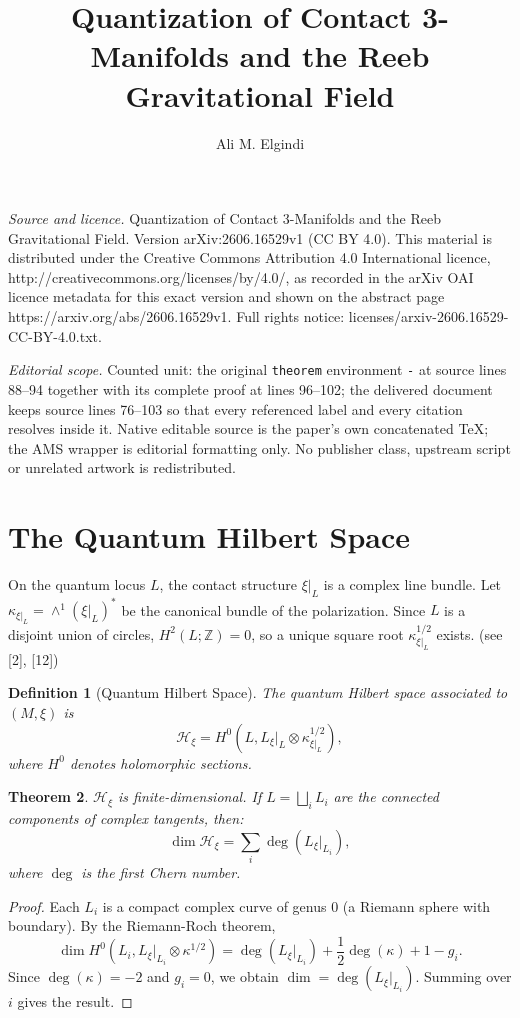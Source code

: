\documentclass[10pt,a4paper]{amsart}
\newtheorem{theorem}{Theorem}[section]
\newtheorem{definition}[theorem]{Definition}
\newcommand{\Z}{\mathbb{Z}}
\newcommand{\Hilb}{\mathcal{H}}
\begin{document}
\title[Quantization of Contact 3-Manifolds and the Reeb Gravitation]{Quantization of Contact 3-Manifolds and the Reeb Gravitational Field}
\author{Ali M. Elgindi}
\date{}
\maketitle
\noindent\emph{Source and licence.} Quantization of Contact 3-Manifolds and the Reeb Gravitational Field. Version arXiv:2606.16529v1 (CC BY 4.0). This material is distributed under the Creative Commons Attribution 4.0 International licence, http://creativecommons.org/licenses/by/4.0/, as recorded in the arXiv OAI licence metadata for this exact version and shown on the abstract page https://arxiv.org/abs/2606.16529v1. Full rights notice: licenses/arxiv-2606.16529-CC-BY-4.0.txt.\par\smallskip
\noindent\textit{Editorial scope.} Counted unit: the original \texttt{theorem} environment \texttt{-} at source lines 88--94 together with its complete proof at lines 96--102; the delivered document keeps source lines 76--103 so that every referenced label and every citation resolves inside it. Native editable source is the paper's own concatenated TeX; the AMS wrapper is editorial formatting only. No publisher class, upstream script or unrelated artwork is redistributed.
\section{The Quantum Hilbert Space}

On the quantum locus $L$, the contact structure $\xi|_L$ is a complex line bundle. Let $\kappa_{\xi|_L} = \wedge^1 (\xi|_L)^*$ be the canonical bundle of the polarization. Since $L$ is a disjoint union of circles, $H^2(L;\Z) = 0$, so a unique square root $\kappa_{\xi|_L}^{1/2}$ exists.  (see [2], [12])

\begin{definition}[Quantum Hilbert Space]
The quantum Hilbert space associated to $(M,\xi)$ is
\[
\Hilb_\xi = H^0(L, L_\xi|_L \otimes \kappa_{\xi|_L}^{1/2}),
\]
where $H^0$ denotes holomorphic sections.
\end{definition}


\begin{theorem}
$\Hilb_\xi$ is finite-dimensional. If $L = \bigsqcup_i L_i$ are the connected components of complex tangents, then:
\[
\dim \Hilb_\xi = \sum_i \deg(L_\xi|_{L_i}),
\]
where $\deg$ is the first Chern number.
\end{theorem}

\begin{proof}
Each $L_i$ is a compact complex curve of genus $0$ (a Riemann sphere with boundary). By the Riemann-Roch theorem,
\[
\dim H^0(L_i, L_\xi|_{L_i} \otimes \kappa^{1/2}) = \deg(L_\xi|_{L_i}) + \frac{1}{2}\deg(\kappa) + 1 - g_i.
\]
Since $\deg(\kappa) = -2$ and $g_i = 0$, we obtain $\dim = \deg(L_\xi|_{L_i})$. Summing over $i$ gives the result.
\end{proof}
\end{document}
